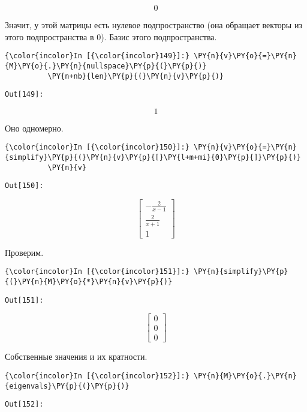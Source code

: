     \[0\]

    

    Значит, у этой матрицы есть нулевое подпространство (она обращает
векторы из этого подпространства в 0). Базис этого подпространства.

    \begin{Verbatim}[commandchars=\\\{\}]
{\color{incolor}In [{\color{incolor}149}]:} \PY{n}{v}\PY{o}{=}\PY{n}{M}\PY{o}{.}\PY{n}{nullspace}\PY{p}{(}\PY{p}{)}
          \PY{n+nb}{len}\PY{p}{(}\PY{n}{v}\PY{p}{)}
\end{Verbatim}
\texttt{\color{outcolor}Out[{\color{outcolor}149}]:}
    
    \[1\]

    

    Оно одномерно.

    \begin{Verbatim}[commandchars=\\\{\}]
{\color{incolor}In [{\color{incolor}150}]:} \PY{n}{v}\PY{o}{=}\PY{n}{simplify}\PY{p}{(}\PY{n}{v}\PY{p}{[}\PY{l+m+mi}{0}\PY{p}{]}\PY{p}{)}
          \PY{n}{v}
\end{Verbatim}
\texttt{\color{outcolor}Out[{\color{outcolor}150}]:}
    
    \[\left[\begin{matrix}- \frac{2}{x - 1}\\\frac{2}{x + 1}\\1\end{matrix}\right]\]

    

    Проверим.

    \begin{Verbatim}[commandchars=\\\{\}]
{\color{incolor}In [{\color{incolor}151}]:} \PY{n}{simplify}\PY{p}{(}\PY{n}{M}\PY{o}{*}\PY{n}{v}\PY{p}{)}
\end{Verbatim}
\texttt{\color{outcolor}Out[{\color{outcolor}151}]:}
    
    \[\left[\begin{matrix}0\\0\\0\end{matrix}\right]\]

    

    Собственные значения и их кратности.

    \begin{Verbatim}[commandchars=\\\{\}]
{\color{incolor}In [{\color{incolor}152}]:} \PY{n}{M}\PY{o}{.}\PY{n}{eigenvals}\PY{p}{(}\PY{p}{)}
\end{Verbatim}
\texttt{\color{outcolor}Out[{\color{outcolor}152}]:}
    
